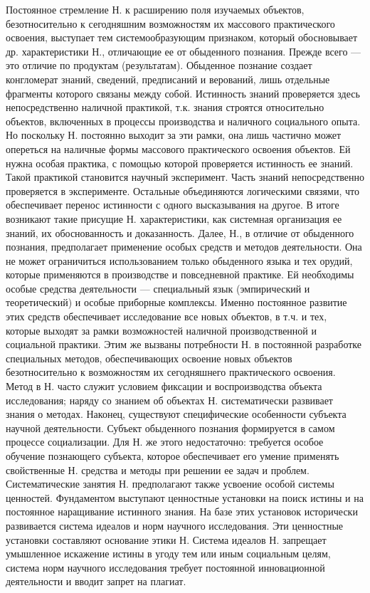 \documentclass[a4paper,12pt]{article}
\begin{document}
Постоянное стремление Н. к расширению поля изучаемых объектов, безотносительно к сегодняшним возможностям их массового практического освоения, выступает тем системообразующим признаком, который обосновывает др. характеристики Н., отличающие ее от обыденного познания. 
Прежде всего — это отличие по продуктам (результатам). Обыденное познание создает конгломерат знаний, сведений, предписаний и верований, лишь отдельные фрагменты которого связаны между собой. Истинность знаний проверяется здесь непосредственно наличной практикой, т.к. знания строятся относительно объектов, включенных в процессы производства и наличного социального опыта. 
Но поскольку Н. постоянно выходит за эти рамки, она лишь частично может опереться на наличные формы массового практического освоения объектов. Ей нужна особая практика, с помощью которой проверяется истинность ее знаний. Такой практикой становится научный эксперимент. Часть знаний непосредственно проверяется в эксперименте. Остальные объединяются логическими связями, что обеспечивает перенос истинности с одного высказывания на другое. В итоге возникают такие присущие Н. характеристики, как системная организация ее знаний, их обоснованность и доказанность. 
Далее, Н., в отличие от обыденного познания, предполагает применение особых средств и методов деятельности. Она не может ограничиться использованием только обыденного языка и тех орудий, которые применяются в производстве и повседневной практике. Ей необходимы особые средства деятельности — специальный язык (эмпирический и теоретический) и особые приборные комплексы. Именно постоянное развитие этих средств обеспечивает исследование все новых объектов, в т.ч. и тех, которые выходят за рамки возможностей наличной производственной и социальной практики. Этим же вызваны потребности Н. в постоянной разработке специальных методов, обеспечивающих освоение новых объектов безотносительно к возможностям их сегодняшнего практического освоения. 
Метод в Н. часто служит условием фиксации и воспроизводства объекта исследования; наряду со знанием об объектах Н. систематически развивает знания о методах. 
Наконец, существуют специфические особенности субъекта научной деятельности. Субъект обыденного познания формируется в самом процессе социализации. Для Н. же этого недостаточно: требуется особое обучение познающего субъекта, которое обеспечивает его умение применять свойственные Н. средства и методы при решении ее задач и проблем. Систематические занятия Н. предполагают также усвоение особой системы ценностей. Фундаментом выступают ценностные установки на поиск истины и на постоянное наращивание истинного знания. На базе этих установок исторически развивается система идеалов и норм научного исследования. Эти ценностные установки составляют основание этики Н. Система идеалов Н. запрещает умышленное искажение истины в угоду тем или иным социальным целям, система норм научного исследования требует постоянной инновационной деятельности и вводит запрет на плагиат. 
\end{document}
